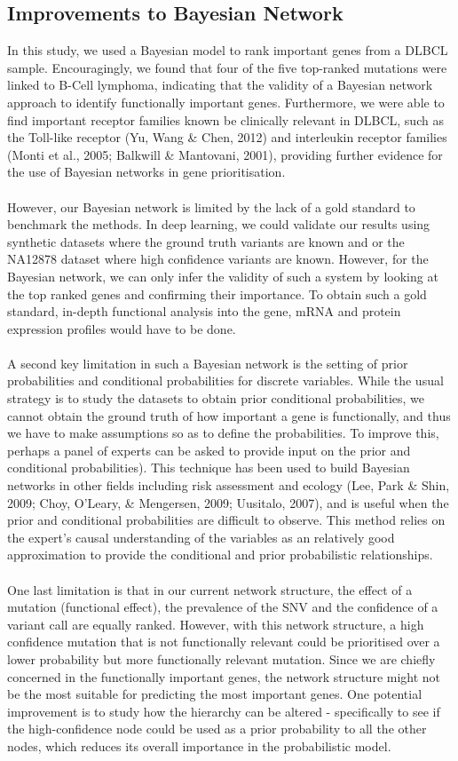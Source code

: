 \documentclass{article}
\begin{document}
\subsection{Improvements to Bayesian Network}
In this study, we used a Bayesian model to rank important genes from a DLBCL sample. Encouragingly, we found that four of the five top-ranked mutations were linked to B-Cell lymphoma, indicating that the validity of a Bayesian network approach to identify functionally important genes. Furthermore, we were able to find important receptor families known be clinically relevant in DLBCL, such as the Toll-like receptor (Yu, Wang \& Chen, 2012) and interleukin receptor families (Monti et al., 2005; Balkwill \& Mantovani, 2001), providing further evidence for the use of Bayesian networks in gene prioritisation. \\\\
However, our Bayesian network is limited by the lack of a gold standard to benchmark the methods. In deep learning, we could validate our results using synthetic datasets where the ground truth variants are known and or the NA12878 dataset where high confidence variants are known. However, for the Bayesian network, we can only infer the validity of such a system by looking at the top ranked genes and confirming their importance. To obtain such a gold standard, in-depth functional analysis into the gene, mRNA and protein expression profiles would have to be done. \\\\
A second key limitation in such a Bayesian network is the setting of prior probabilities and conditional probabilities for discrete variables. While the usual strategy is to study the datasets to obtain prior conditional probabilities, we cannot obtain the ground truth of how important a gene is functionally, and thus we have to make assumptions so as to define the probabilities. To improve this, perhaps a panel of experts can be asked to provide input on the prior and conditional probabilities). This technique has been used to build Bayesian networks in other fields including risk assessment and ecology (Lee, Park \& Shin, 2009; Choy, O'Leary, \& Mengersen, 2009; Uusitalo, 2007), and is useful when the prior and conditional probabilities are difficult to observe. This method relies on the expert's causal understanding of the variables as an relatively good approximation to provide the conditional and prior probabilistic relationships. \\\\
One last limitation is that in our current network structure, the effect of a mutation (functional effect), the prevalence of the SNV and the confidence of a variant call are equally ranked. However, with this network structure, a high confidence mutation that is not functionally relevant could be prioritised over a lower probability but more functionally relevant mutation. Since we are chiefly concerned in the functionally important genes, the network structure might not be the most suitable for predicting the most important genes. One potential improvement is to study how the hierarchy can be altered - specifically to see if the high-confidence node could be used as a prior probability to all the other nodes, which reduces its overall importance in the probabilistic model.
\end{document}
